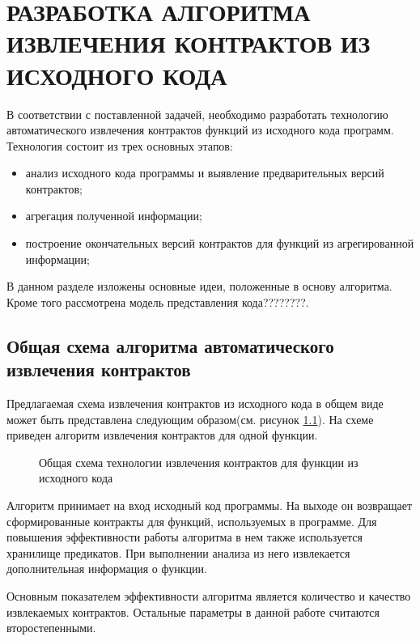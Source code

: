 \chapter{РАЗРАБОТКА АЛГОРИТМА ИЗВЛЕЧЕНИЯ КОНТРАКТОВ ИЗ ИСХОДНОГО КОДА}
\label{chapter:algoritm}
В соответствии с поставленной задачей, необходимо разработать технологию автоматического извлечения контрактов функций из исходного кода программ. Технология состоит из трех основных этапов:
\begin{itemize}
\item анализ исходного кода программы и выявление предварительных версий контрактов;
\item агрегация полученной информации;
\item построение окончательных версий контрактов для функций из агрегированной  информации;
\end{itemize}

В данном разделе изложены основные идеи, положенные в основу алгоритма. Кроме того рассмотрена модель представления кода????????.

\section{Общая схема алгоритма автоматического извлечения контрактов}
Предлагаемая схема извлечения контрактов из исходного кода в общем виде может быть представлена следующим образом(см. рисунок \ref{image:generalScheme}). На схеме приведен алгоритм извлечения контрактов для одной функции.
\begin{figure}[h!]
\caption{Общая схема технологии извлечения контрактов для функции из исходного кода}
\label{image:generalScheme}
\end{figure}

Алгоритм принимает на вход исходный код программы. На выходе он возвращает сформированные контракты для функций, используемых в программе. Для повышения эффективности работы алгоритма в нем также используется хранилище предикатов. При выполнении анализа из него извлекается дополнительная информация о функции.

Основным показателем эффективности алгоритма является количество и качество извлекаемых контрактов. Остальные параметры в данной работе считаются второстепенными.

